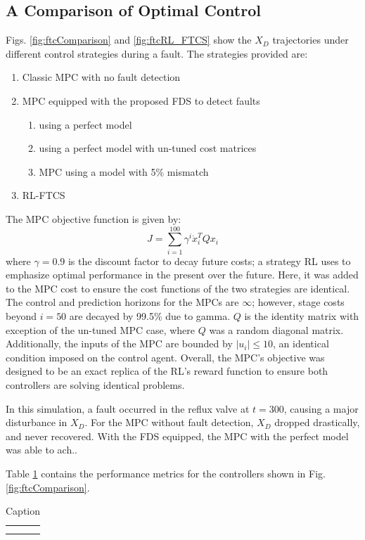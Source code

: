 \subsection{A Comparison of Optimal Control}

Figs. \ref{fig:ftcComparison} and \ref{fig:ftcRL_FTCS} show the $X_D$ trajectories under different control strategies during a fault. The strategies provided are:
\begin{enumerate}
    \item Classic MPC with no fault detection
    \item MPC equipped with the proposed FDS to detect faults
    \begin{enumerate}
        \item using a perfect model
        \item using a perfect model with un-tuned cost matrices
        \item MPC using a model with 5\% mismatch 
    \end{enumerate}
    \item RL-FTCS
\end{enumerate}

The MPC objective function is given by:
\begin{equation}
    J = \sum\limits^{100}_{i=1} \gamma^i \dot x_i^T Q x_i
\end{equation}
where $\gamma = 0.9$ is the discount factor to decay future costs; a strategy RL uses to emphasize optimal performance in the present over the future. Here, it was added to the MPC cost to ensure the cost functions of the two strategies are identical.  The control and prediction horizons for the MPCs are $\infty$; however, stage costs beyond $i = 50$ are decayed by 99.5\% due to gamma. $Q$ is the identity matrix with exception of the un-tuned MPC case, where $Q$ was a random diagonal matrix. Additionally, the inputs of the MPC are bounded by $|u_i| \leq 10$, an identical condition imposed on the control agent. Overall, the MPC's objective was designed to be an exact replica of the RL's reward function to ensure both controllers are solving identical problems.

In this simulation, a fault occurred in the reflux valve at $t = 300$, causing a major disturbance in $X_D$. For the MPC without fault detection, $X_D$ dropped drastically, and never recovered.  With the FDS equipped, the MPC with the perfect model was able to ach..

Table \ref{tab:08fault_performance} contains the performance metrics for the controllers shown in Fig. \ref{fig:ftcComparison}.  
\begin{table}[]
    \centering
    \begin{tabular}{c|c}
         &  \\
         & 
    \end{tabular}
    \caption{Caption}
    \label{tab:08fault_performance}
\end{table}



